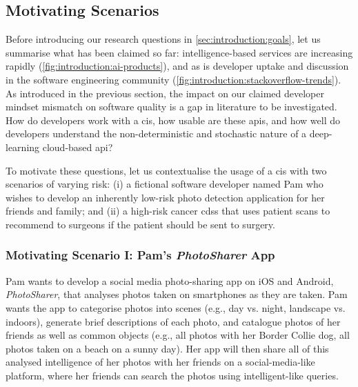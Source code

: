 \subsection{Motivating Scenarios}
\label{ssec:introduction:motivation:scenario}

Before introducing our research questions in \cref{sec:introduction:goals}, let us summarise what has been claimed so far: intelligence-based services are increasing rapidly (\cref{fig:introduction:ai-products}), and as is developer uptake and discussion in the software engineering community (\cref{fig:introduction:stackoverflow-trends}). As introduced in the previous section, the impact on our claimed developer mindset mismatch on software quality is a gap in literature to be investigated. How do developers work with a \gls{cis}, how usable are these \glspl{api}, and how well do developers understand the non-deterministic and stochastic nature of a deep-learning cloud-based \gls{api}? 

To motivate these questions, let us contextualise the usage of a \gls{cis} with two scenarios of varying risk: (i) a fictional software developer named Pam who wishes to develop an inherently low-risk photo detection application for her friends and family; and (ii) a high-risk cancer \gls{cdss} that uses patient scans to recommend to surgeons if the patient should be sent to surgery.
  
\subsubsection{Motivating Scenario I: Pam's \textit{PhotoSharer} App}
\label{ssec:introduction:motivation:scenario:pam}

Pam wants to develop a social media photo-sharing app on iOS and Android, \textit{PhotoSharer}, that analyses photos taken on smartphones as they are taken. Pam wants the app to categorise photos into scenes (e.g., day vs. night, landscape vs. indoors), generate brief descriptions of each photo, and catalogue photos of her friends as well as common objects (e.g., all photos with her Border Collie dog, all photos taken on a beach on a sunny day). Her app will then share all of this analysed intelligence of her photos with her friends on a social-media-like platform, where her friends can search the photos using intelligent-like queries.

